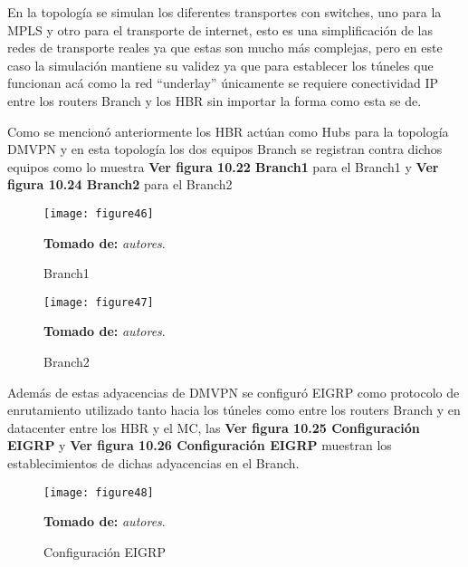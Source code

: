 En la topología se simulan los diferentes transportes con switches, uno para la MPLS y otro para el transporte de internet, esto es una simplificación de las redes de transporte reales ya que estas son mucho más complejas, pero en este caso la simulación mantiene su validez ya que para establecer los túneles que funcionan acá como la red “underlay” únicamente se requiere conectividad IP entre los routers Branch y los HBR sin importar la forma como esta se de.

Como se mencionó anteriormente los HBR actúan como Hubs para la topología DMVPN y en esta topología los dos equipos Branch se registran contra dichos equipos como lo muestra \textbf{Ver figura 10.22 Branch1} para el Branch1 y \textbf{Ver figura 10.24 Branch2} para el Branch2

\begin{figure}[htbp]
  \centering
    {\texttt{[image: figure46]}}%
  \caption{Branch1}
  \textbf{Tomado de:} \textit{autores}.
  \label{fig:fig2subfig}
\end{figure}


\begin{figure}[htbp]
  \centering
    {\texttt{[image: figure47]}}%
  \caption{Branch2}
  \textbf{Tomado de:} \textit{autores}.
  \label{fig:fig2subfig}
\end{figure}

Además de estas adyacencias de DMVPN se configuró EIGRP como protocolo de enrutamiento utilizado tanto hacia los túneles como entre los routers Branch y en datacenter entre los HBR y el MC, las \textbf{Ver figura 10.25 Configuración EIGRP} y \textbf{Ver figura 10.26 Configuración EIGRP} muestran los establecimientos de dichas adyacencias en el Branch.

\begin{figure}[htbp]
  \centering
    {\texttt{[image: figure48]}}%
  \caption{Configuración EIGRP}
  \textbf{Tomado de:} \textit{autores}.
  \label{fig:fig2subfig}
\end{figure}


